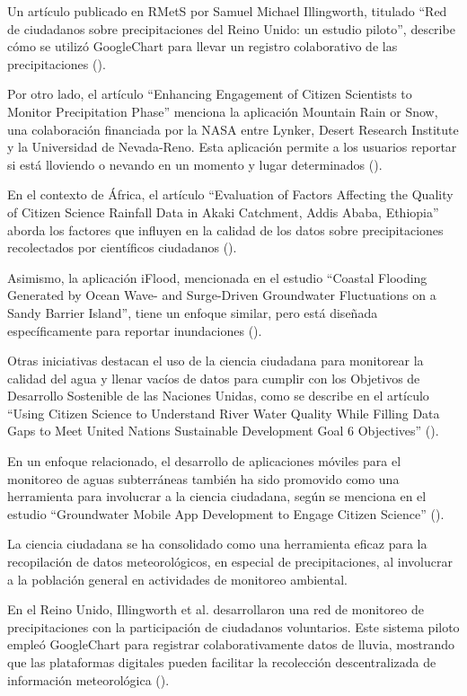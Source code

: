 Un artículo publicado en RMetS por Samuel Michael Illingworth, titulado ``Red de ciudadanos sobre precipitaciones del Reino Unido: un estudio piloto'', describe cómo se utilizó GoogleChart para llevar un registro colaborativo de las precipitaciones (\cite{illingworth2021ukprecipitation}).

Por otro lado, el artículo ``Enhancing Engagement of Citizen Scientists to Monitor Precipitation Phase'' menciona la aplicación Mountain Rain or Snow, una colaboración financiada por la NASA entre Lynker, Desert Research Institute y la Universidad de Nevada-Reno. Esta aplicación permite a los usuarios reportar si está lloviendo o nevando en un momento y lugar determinados (\cite{lute2021enhancing}).


En el contexto de África, el artículo ``Evaluation of Factors Affecting the Quality of Citizen Science Rainfall Data in Akaki Catchment, Addis Ababa, Ethiopia'' aborda los factores que influyen en la calidad de los datos sobre precipitaciones recolectados por científicos ciudadanos (\cite{tedla2022evaluation}).

Asimismo, la aplicación iFlood, mencionada en el estudio ``Coastal Flooding Generated by Ocean Wave- and Surge-Driven Groundwater Fluctuations on a Sandy Barrier Island'', tiene un enfoque similar, pero está diseñada específicamente para reportar inundaciones (\cite{elgar2021coastal}). 


Otras iniciativas destacan el uso de la ciencia ciudadana para monitorear la calidad del agua y llenar vacíos de datos para cumplir con los Objetivos de Desarrollo Sostenible de las Naciones Unidas, como se describe en el artículo ``Using Citizen Science to Understand River Water Quality While Filling Data Gaps to Meet United Nations Sustainable Development Goal 6 Objectives'' (\cite{mcginn2021using}).

En un enfoque relacionado, el desarrollo de aplicaciones móviles para el monitoreo de aguas subterráneas también ha sido promovido como una herramienta para involucrar a la ciencia ciudadana, según se menciona en el estudio ``Groundwater Mobile App Development to Engage Citizen Science'' (\cite{dennis2019groundwater}).


La ciencia ciudadana se ha consolidado como una herramienta eficaz para la recopilación de datos meteorológicos, en especial de precipitaciones, al involucrar a la población general en actividades de monitoreo ambiental.

En el Reino Unido, Illingworth et al. desarrollaron una red de monitoreo de precipitaciones con la participación de ciudadanos voluntarios. Este sistema piloto empleó GoogleChart para registrar colaborativamente datos de lluvia, mostrando que las plataformas digitales pueden facilitar la recolección descentralizada de información meteorológica (\cite{illingworth2021ukprecipitation}).

